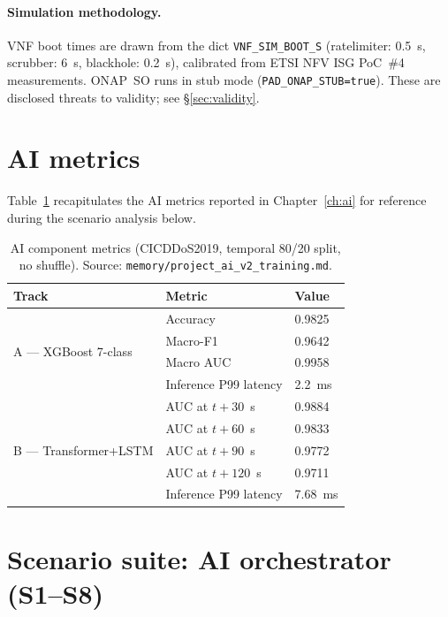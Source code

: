 \paragraph{Simulation methodology.}
VNF boot times are drawn from the dict \texttt{VNF\_SIM\_BOOT\_S}
(ratelimiter: 0.5~s, scrubber: 6~s, blackhole: 0.2~s), calibrated from
ETSI NFV ISG PoC~\#4 measurements. ONAP~SO runs in stub mode
(\texttt{PAD\_ONAP\_STUB=true}). These are disclosed threats to validity;
see \S\ref{sec:validity}.

\section{AI metrics}
\label{sec:ai-metrics-eval}

Table~\ref{tab:ai-metrics} recapitulates the AI metrics reported in
Chapter~\ref{ch:ai} for reference during the scenario analysis below.

\begin{table}[H]
\centering
\small
\caption{AI component metrics (CICDDoS2019, temporal 80/20 split, no shuffle).
Source: \texttt{memory/project\_ai\_v2\_training.md}.}
\label{tab:ai-metrics}
\begin{tabular}{@{}lll@{}}
\toprule
Track & Metric & Value \\
\midrule
\multirow{4}{*}{A — XGBoost 7-class}
  & Accuracy              & 0.9825 \\
  & Macro-F1              & 0.9642 \\
  & Macro AUC             & 0.9958 \\
  & Inference P99 latency & 2.2~ms \\
\midrule
\multirow{5}{*}{B — Transformer+LSTM}
  & AUC at $t{+}30$~s  & 0.9884 \\
  & AUC at $t{+}60$~s  & 0.9833 \\
  & AUC at $t{+}90$~s  & 0.9772 \\
  & AUC at $t{+}120$~s & 0.9711 \\
  & Inference P99 latency & 7.68~ms \\
\bottomrule
\end{tabular}
\end{table}

\section{Scenario suite: \padonap{} AI orchestrator (S1--S8)}
\label{sec:s1-s8}

